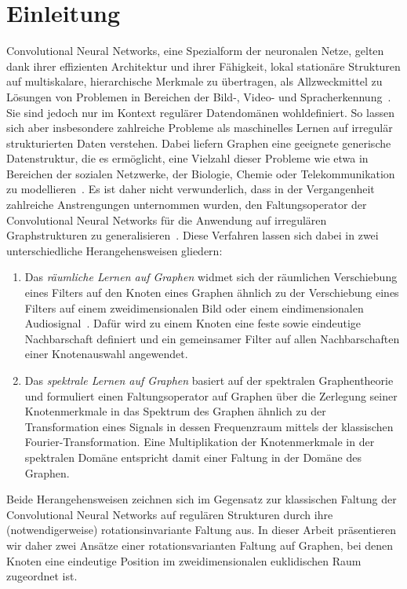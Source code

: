 \chapter{Einleitung}
\label{einleitung}

Convolutional Neural Networks, eine Spezialform der neuronalen Netze, gelten dank ihrer effizienten Architektur und ihrer Fähigkeit, lokal stationäre Strukturen auf multiskalare, hierarchische Merkmale zu übertragen, als Allzweckmittel zu Lösungen von Problemen in Bereichen der Bild-, Video- und Spracherkennung~\cite{Defferrard}.
Sie sind jedoch nur im Kontext regulärer Datendomänen wohldefiniert.
So lassen sich aber insbesondere zahlreiche Probleme als maschinelles Lernen auf irregulär strukturierten Daten verstehen.
Dabei liefern Graphen eine geeignete generische Datenstruktur, die es ermöglicht, eine Vielzahl dieser Probleme wie etwa in Bereichen der sozialen Netzwerke, der Biologie, Chemie oder Telekommunikation zu modellieren~\cite{Shuman}.
Es ist daher nicht verwunderlich, dass in der Vergangenheit zahlreiche Anstrengungen unternommen wurden, den Faltungsoperator der Convolutional Neural Networks für die Anwendung auf irregulären Graphstrukturen zu generalisieren~\cite{patchy, Defferrard, gcn}.
Diese Verfahren lassen sich dabei in zwei unterschiedliche Herangehensweisen gliedern:
\begin{enumerate}
  \item Das \emph{räumliche Lernen auf Graphen} widmet sich der räumlichen Verschiebung eines Filters auf den Knoten eines Graphen ähnlich zu der Verschiebung eines Filters auf einem zweidimensionalen Bild oder einem eindimensionalen Audiosignal~\cite{patchy}.
  Dafür wird zu einem Knoten eine feste sowie eindeutige Nachbarschaft definiert und ein gemeinsamer Filter auf allen Nachbarschaften einer Knotenauswahl angewendet.
  \item Das \emph{spektrale Lernen auf Graphen} basiert auf der spektralen Graphentheorie und formuliert einen Faltungsoperator auf Graphen über die Zerlegung seiner Knotenmerkmale in das Spektrum des Graphen ähnlich zu der Transformation eines Signals in dessen Frequenzraum mittels der klassischen Fourier-Transformation.
  Eine Multiplikation der Knotenmerkmale in der spektralen Domäne entspricht damit einer Faltung in der Domäne des Graphen.
\end{enumerate}
Beide Herangehensweisen zeichnen sich im Gegensatz zur klassischen Faltung der Convolutional Neural Networks auf regulären Strukturen durch ihre (notwendigerweise) rotationsinvariante Faltung aus.
In dieser Arbeit präsentieren wir daher zwei Ansätze \bzgl{} einer rotationsvarianten Faltung auf Graphen, bei denen Knoten eine eindeutige Position im zweidimensionalen euklidischen Raum zugeordnet ist.



